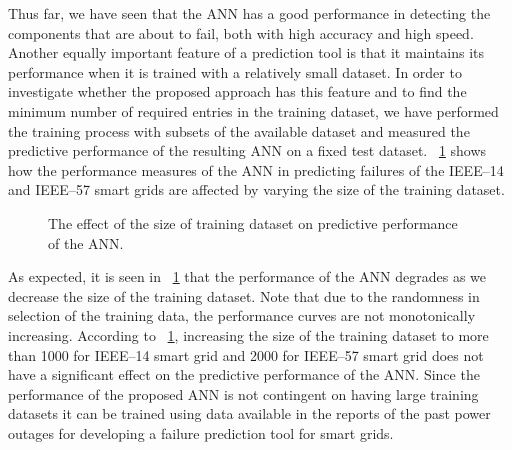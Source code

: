 \documentclass[12pt]{elsarticle}
\begin{document}
Thus far, we have seen that the ANN has a good performance in detecting the components that are about to fail, both with high accuracy and high speed. Another equally important feature of a prediction tool is that it maintains its performance when it is trained with a relatively small dataset. In order to investigate whether the proposed approach has this feature and to find the minimum number of required entries in the training dataset, we have performed the training process with subsets of the available dataset and measured the predictive performance of the resulting ANN on a fixed test dataset. \figurename~\ref{fig:nn_training_size} shows how the performance measures of the ANN in predicting failures of the IEEE--14 and IEEE--57 smart grids are affected by varying the size of the training dataset.

\begin{figure}[!h]
\centering
{}

\caption{The effect of the size of training dataset on predictive performance of the ANN.}
\label{fig:nn_training_size}
\end{figure}

As expected, it is seen in \figurename~\ref{fig:nn_training_size} that the performance of the ANN degrades as we decrease the size of the training dataset. Note that due to the randomness in selection of the training data, the performance curves are not monotonically increasing. According to \figurename~\ref{fig:nn_training_size}, increasing the size of the training dataset to more than 1000 for IEEE--14 smart grid and 2000 for IEEE--57 smart grid does not have a significant effect on the predictive performance of the ANN. Since the performance of the proposed ANN is not contingent on having large training datasets it can be trained using data available in the reports of the past power outages for developing a failure prediction tool for smart grids.
\end{document}
